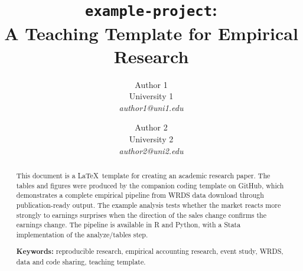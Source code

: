 \documentclass[english,12pt]{article}
\date{}
\begin{document}
\DeclareCiteCommand{\citepos}
  {}
  {%
   }
  {\multicitedelim}
  {}

\setlength{\abovedisplayskip}{4pt}
\setlength{\belowdisplayskip}{4pt}

\clearpage
\begin{singlespace}
\title{\textbf{\large\texttt{example-project}: \\ A Teaching Template for Empirical Research}}
\vspace{-1ex}
{\author{\normalsize Author 1 \\ University 1 \\ \textit{author1@uni1.edu} \vspace{-2ex} \and \normalsize Author 2  \\ University 2  \\ \textit{author2@uni2.edu}} }
\maketitle
\end{singlespace}
\thispagestyle{empty}

\begin{singlespace}
\vspace{-0.5in}
\begin{abstract}
\noindent This document is a \LaTeX\ template for creating an academic research paper. The tables and figures were produced by the companion coding template on GitHub, which demonstrates a complete empirical pipeline from WRDS data download through publication-ready output. The example analysis tests whether the market reacts more strongly to earnings surprises when the direction of the sales change confirms the earnings change. The pipeline is available in R and Python, with a Stata implementation of the analyze/tables step.

\bigskip

\noindent \textbf{Keywords:} reproducible research, empirical accounting research, event study, WRDS, data and code sharing, teaching template.
\end{abstract}
\end{singlespace}
\end{document}
